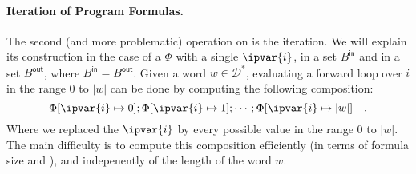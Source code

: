 \paragraph{Iteration of Program Formulas.} The second (and more problematic)
operation on  is the iteration. We will explain its
construction in the case of a  $\Phi$ with a single
 $\ipvar{i}$,  in a set
$B^{\mathsf{in}}$ and  in a set
$B^{\mathsf{out}}$, where $B^{\mathsf{in}} = B^{\mathsf{out}}$. Given a word $w \in \mathcal{D}^*$, evaluating a forward
loop over $i$ in the range $0$ to $|w|$ can be done by computing the following
composition: 
\begin{equation}
    \label{eq:iteration-dumb}
    \Phi[\ipvar{i} \mapsto 0] ; \Phi[\ipvar{i} \mapsto 1] ; \cdots ;
    \Phi[\ipvar{i} \mapsto |w|] \quad ,
\end{equation}
Where we replaced the 
$\ipvar{i}$ by every possible value in the range $0$ to $|w|$. The main
difficulty is to compute this composition efficiently (in terms of formula size and 
), and indepenently of the
length of the word $w$.

